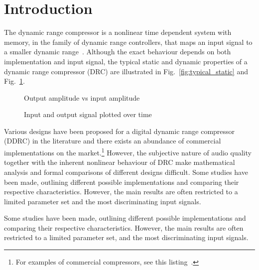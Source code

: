 \documentclass[../main2.tex]{subfiles}
\providecommand{\rootdir}{..}
\begin{document}
\section{Introduction}
The dynamic range compressor is a nonlinear time dependent system with memory, in the family of dynamic range controllers, that maps an input signal to a smaller dynamic range~\cite{dafx11}. Although the exact behaviour depends on both implementation and input signal, the typical static and dynamic properties of a dynamic range compressor (DRC) are illustrated in Fig.~\ref{fig:typical_static} and Fig.~\ref{fig:typical_envelope}.

\begin{figure}[ht]
\captionsetup{justification=centering}

\begin{minipage}[t]{.5\textwidth}
 \centering

\caption{Output amplitude vs input amplitude} 
\label{fig:typical_static}
\end{minipage}%
\begin{minipage}[t]{.5\textwidth}
\centering

\caption{Input and output signal plotted over time} 
\label{fig:typical_envelope}
\end{minipage}
\end{figure}

Various designs have been proposed for a digital dynamic range compressor (DDRC) in the literature and there exists an abundance of commercial implementations on the market.\footnote{For examples of commercial compressors, see this listing~\cite{commercial}.} However, the subjective nature of audio quality together with the inherent nonlinear behaviour of DRC make mathematical analysis and formal comparisons of different designs difficult. Some studies have been made, outlining different possible implementations and comparing their respective characteristics. However, the main results are often restricted to a limited parameter set and the most discriminating input signals. 

Some studies have been made, outlining different possible implementations and comparing their respective characteristics. However, the main results are often restricted to a limited parameter set, and the most discriminating input signals.


\end{document}
